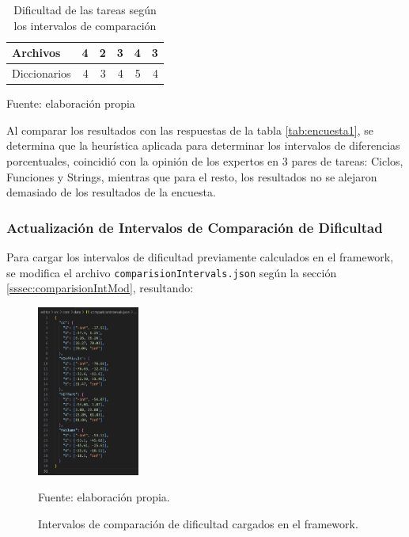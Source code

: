 \documentclass[letterpaper,12pt]{article}
\begin{document}
\begin{table}[H]
\begin{tabular}{|l|r|r|r|r|r|}
    Archivos        & 4                                                                                                & 2                                           & 3                                      & 4                                     & 3                                      \\ \hline
    Diccionarios    & 4                                                                                                & 3                                           & 4                                      & 5                                     & 4                                      \\ \hline
  \end{tabular}
  \caption{Dificultad de las tareas según los intervalos de comparación} Fuente: elaboración propia
  \label{tab:difDifferences}
\end{table}
Al comparar los resultados con las respuestas de la tabla \ref{tab:encuesta1}, se determina que la heurística aplicada para determinar los intervalos de diferencias porcentuales, coincidió con la opinión de los expertos en 3 pares de tareas: Ciclos, Funciones y Strings, mientras que para el resto, los resultados no se alejaron demasiado de los resultados de la encuesta.
\subsubsection{Actualización de Intervalos de Comparación de Dificultad}
Para cargar los intervalos de dificultad previamente calculados en el framework, se modifica el archivo \texttt{comparisionIntervals.json} según la sección \ref{sssec:comparisionIntMod}, resultando:
\begin{figure}[H]
  \centering
  \includegraphics[width=0.3\textwidth]{figures/intervals5.png}
  \caption{Intervalos de comparación de dificultad cargados en el framework.} Fuente: elaboración propia.
  \label{img:intervals5}
\end{figure}
\end{document}
